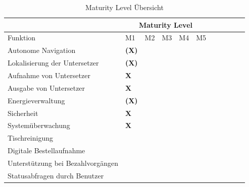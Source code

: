 \documentclass[
  a4paper,
  12pt,
  DIV=12,        %
  parskip=half,  %
  headings=small %
]{scrartcl}
\theoremstyle{definition}
\theoremstyle{definition}
\begin{document}
\sloppy %
\begin{longtable}{@{}p{6cm}|p{1cm}p{1cm}p{1cm}p{1cm}p{1cm}@{}|ccccc@{}}
\caption{Maturity Level Übersicht} \\
\toprule
& \multicolumn{5}{c}{\centering Maturity Level} \\
\midrule[1pt] %

Funktion & M1 & M2 & M3 & M4 & M5 \\
\toprule
\endfirsthead

\endhead



Autonome Navigation & \centering\textbf{(X)} & &  &  &  \\
\toprule

Lokalisierung der Untersetzer & \centering\textbf{(X)} &  &  &  &  \\
\toprule

Aufnahme von Untersetzer & \centering\textbf{X} &  &  &  &  \\
\toprule

Ausgabe von Untersetzer & \centering\textbf{X} &  &  &  &  \\
\toprule

Energieverwaltung & \cellcolor{greybg} \centering\textbf{(X)} &  &  &  &  \\
\toprule

Sicherheit & \centering\textbf{X} &  &  &  &  \\
\toprule

Systemüberwachung & \centering\textbf{X} &  &  &  &  \\
\toprule

Tischreinigung & \cellcolor{greybg} &  &  &  &  \\
\toprule

Digitale Bestellaufnahme & \cellcolor[HTML]{EFEFEF} & \cellcolor[HTML]{EFEFEF} &  &  &  \\
\toprule

Unterstützung bei Bezahlvorgängen & \cellcolor[HTML]{EFEFEF} & \cellcolor[HTML]{EFEFEF} &  &  &  \\
\toprule

Statusabfragen durch Benutzer & \cellcolor[HTML]{EFEFEF} & \cellcolor[HTML]{EFEFEF} & \cellcolor[HTML]{EFEFEF} &  &  \\
\toprule


\end{longtable}
\end{document}
